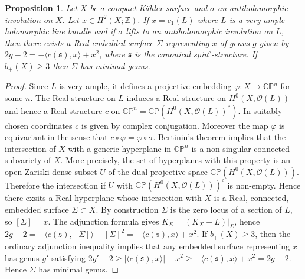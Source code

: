 \documentclass{amsart}
\newtheorem{proposition}[theorem]{Proposition}
\theoremstyle{definition}
\theoremstyle{remark}
\numberwithin{equation}{section}
\begin{document}
\begin{proposition}\label{prop:vample}
Let $X$ be a compact K\"ahler surface and $\sigma$ an antiholomorphic involution on $X$. Let $x \in H^2(X ; \mathbb{Z})$. If $x = c_1(L)$ where $L$ is a very ample holomorphic line bundle and if $\sigma$ lifts to an antiholomorphic involution on $L$, then there exists a Real embedded surface $\Sigma$ representing $x$ of genus $g$ given by $2g-2 = -\langle c(\mathfrak{s}) , x \rangle + x^2$, where $\mathfrak{s}$ is the canonical spin$^c$-structure. If $b_+(X) \ge 3$ then $\Sigma$ has minimal genus.
\end{proposition}
\begin{proof}
Since $L$ is very ample, it defines a projective embedding $\varphi : X \to \mathbb{CP}^n$ for some $n$. The Real structure on $L$ induces a Real structure on $H^0(X , \mathcal{O}(L))$ and hence a Real structure $c$ on $\mathbb{CP}^n = \mathbb{CP}( H^0(X , \mathcal{O}(L))^*)$. In suitably chosen coordinates $c$ is given by complex conjugation. Moreover the map $\varphi$ is equivariant in the sense that $c \circ \varphi = \varphi \circ \sigma$. Bertinin's theorem implies that the intersection of $X$ with a generic hyperplane in $\mathbb{CP}^n$ is a non-singular connected subvariety of $X$. More precisely, the set of hyperplanes with this property is an open Zariski dense subset $U$ of the dual projective space $\mathbb{CP}( H^0(X , \mathcal{O}(L)))$. Therefore the intersection if $U$ with $\mathbb{CP}( H^0(X , \mathcal{O}(L)) )^{c}$ is non-empty. Hence there exsits a Real hyperplane whose intersection with $X$ is a Real, connected, embedded surface $\Sigma \subset X$. By construction $\Sigma$ is the zero locus of a section of $L$, so $[\Sigma] = x$. The adjunction formula gives $K_\Sigma = (K_X + L)|_\Sigma$, hence $2g-2 = -\langle c(\mathfrak{s}) , [\Sigma] \rangle + [\Sigma]^2 = -\langle c(\mathfrak{s}) , x\rangle + x^2$. If $b_+(X) \ge 3$, then the ordinary adjunction inequality implies that any embedded surface representing $x$ has genus $g'$ satisfying $2g'-2 \ge |\langle c(\mathfrak{s}) , x \rangle | + x^2 \ge -\langle c(\mathfrak{s}) , x \rangle + x^2 = 2g-2$. Hence $\Sigma$ has minimal genus.
\end{proof}
\end{document}
